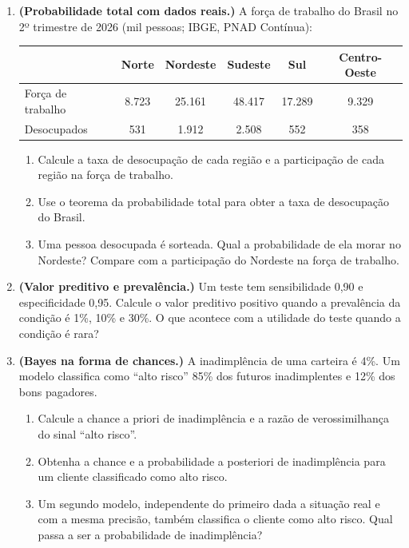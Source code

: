 \documentclass[11pt]{article}
\begin{document}
\begin{enumerate}[label=\textbf{A\arabic*.}, leftmargin=*]

\item \textbf{(Probabilidade total com dados reais.)} A força de trabalho do Brasil no 2º trimestre de 2026 (mil pessoas; IBGE, PNAD Contínua):
\begin{center}
\begin{tabular}{l|ccccc}
\toprule
 & Norte & Nordeste & Sudeste & Sul & Centro-Oeste \\
\midrule
Força de trabalho & 8.723 & 25.161 & 48.417 & 17.289 & 9.329 \\
Desocupados & 531 & 1.912 & 2.508 & 552 & 358 \\
\bottomrule
\end{tabular}
\end{center}
\begin{enumerate}[label=(\alph*)]
  \item Calcule a taxa de desocupação de cada região e a participação de cada região na força de trabalho.
  \item Use o teorema da probabilidade total para obter a taxa de desocupação do Brasil.
  \item Uma pessoa desocupada é sorteada. Qual a probabilidade de ela morar no Nordeste? Compare com a participação do Nordeste na força de trabalho.
\end{enumerate}

\item \textbf{(Valor preditivo e prevalência.)} Um teste tem sensibilidade 0,90 e especificidade 0,95. Calcule o valor preditivo positivo
quando a prevalência da condição é 1\%, 10\% e 30\%. O que acontece com a utilidade do teste quando a condição é rara?

\item \textbf{(Bayes na forma de chances.)} A inadimplência de uma carteira é 4\%. Um modelo classifica como ``alto risco'' 85\% dos futuros
inadimplentes e 12\% dos bons pagadores.
\begin{enumerate}[label=(\alph*)]
  \item Calcule a chance a priori de inadimplência e a razão de verossimilhança do sinal ``alto risco''.
  \item Obtenha a chance e a probabilidade a posteriori de inadimplência para um cliente classificado como alto risco.
  \item Um segundo modelo, independente do primeiro dada a situação real e com a mesma precisão, também classifica o cliente como alto risco.
    Qual passa a ser a probabilidade de inadimplência?
\end{enumerate}


\end{enumerate}
\end{document}
